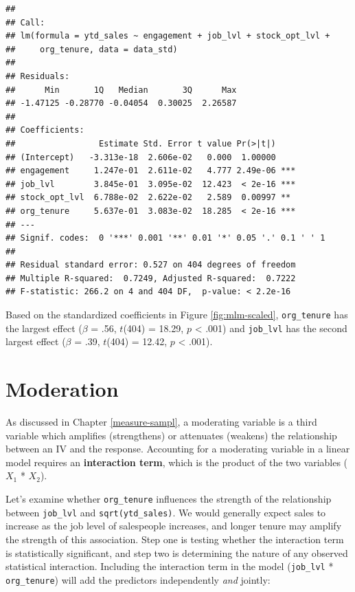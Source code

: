 \documentclass[
]{book}
\begin{document}
\begin{verbatim}
## 
## Call:
## lm(formula = ytd_sales ~ engagement + job_lvl + stock_opt_lvl + 
##     org_tenure, data = data_std)
## 
## Residuals:
##      Min       1Q   Median       3Q      Max 
## -1.47125 -0.28770 -0.04054  0.30025  2.26587 
## 
## Coefficients:
##                 Estimate Std. Error t value Pr(>|t|)    
## (Intercept)   -3.313e-18  2.606e-02   0.000  1.00000    
## engagement     1.247e-01  2.611e-02   4.777 2.49e-06 ***
## job_lvl        3.845e-01  3.095e-02  12.423  < 2e-16 ***
## stock_opt_lvl  6.788e-02  2.622e-02   2.589  0.00997 ** 
## org_tenure     5.637e-01  3.083e-02  18.285  < 2e-16 ***
## ---
## Signif. codes:  0 '***' 0.001 '**' 0.01 '*' 0.05 '.' 0.1 ' ' 1
## 
## Residual standard error: 0.527 on 404 degrees of freedom
## Multiple R-squared:  0.7249, Adjusted R-squared:  0.7222 
## F-statistic: 266.2 on 4 and 404 DF,  p-value: < 2.2e-16
\end{verbatim}

Based on the standardized coefficients in Figure \ref{fig:mlm-scaled}, \texttt{org\_tenure} has the largest effect (\(\beta\) = .56, \(t\)(404) = 18.29, \(p\) \textless{} .001) and \texttt{job\_lvl} has the second largest effect (\(\beta\) = .39, \(t\)(404) = 12.42, \(p\) \textless{} .001).

\hypertarget{moderation}{%
\section{Moderation}\label{moderation}}

As discussed in Chapter \ref{measure-sampl}, a moderating variable is a third variable which amplifies (strengthens) or attenuates (weakens) the relationship between an IV and the response. Accounting for a moderating variable in a linear model requires an \textbf{interaction term}, which is the product of the two variables (\(X_1\) * \(X_2\)).

Let's examine whether \texttt{org\_tenure} influences the strength of the relationship between \texttt{job\_lvl} and \texttt{sqrt(ytd\_sales)}. We would generally expect sales to increase as the job level of salespeople increases, and longer tenure may amplify the strength of this association. Step one is testing whether the interaction term is statistically significant, and step two is determining the nature of any observed statistical interaction. Including the interaction term in the model (\texttt{job\_lvl} * \texttt{org\_tenure}) will add the predictors independently \emph{and} jointly:
\end{document}
